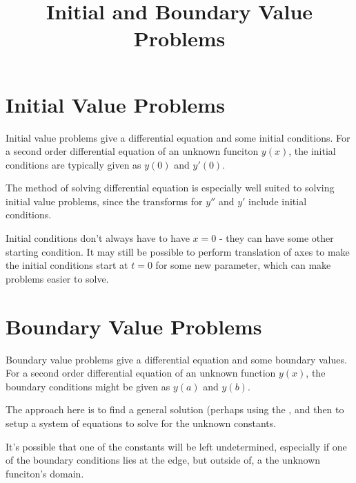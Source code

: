 \documentclass{article}
\title{Initial and Boundary Value Problems}
\begin{document}
\section{Initial Value Problems}

Initial value problems give a differential equation and some initial conditions. For a second order differential equation of an unknown funciton $y(x)$, the initial conditions are typically given as $y(0)$ and $y'(0)$.

The  method of solving differential equation is especially well suited to solving initial value problems, since the transforms for $y''$ and $y'$ include initial conditions.

Initial conditions don't always have to have $x=0$ - they can have some other starting condition. It may still be possible to perform translation of axes to make the initial conditions start at $t=0$ for some new parameter, which can make problems easier to solve.

\section{Boundary Value Problems}

Boundary value problems give a differential equation and some boundary values. For a second order differential equation of an unknown function $y(x)$, the boundary conditions might be given as $y(a)$ and $y(b)$.

The approach here is to find a general solution (perhaps using the , and then to setup a system of equations to solve for the unknown constants.

It's possible that one of the constants will be left undetermined, especially if one of the boundary conditions lies at the edge, but outside of, a the unknown funciton's domain.
\end{document}
